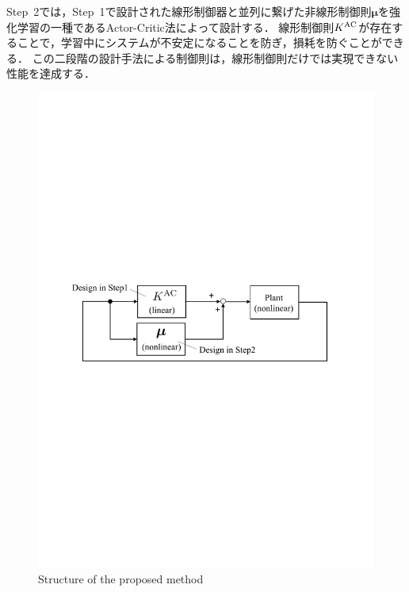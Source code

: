 \documentclass[twocolumn]{jarticle}
\begin{document}
Step~2では，Step~1で設計された線形制御器と並列に繋げた非線形制御則$\bm{\mu}$を強化学習の一種であるActor-Critic法\cite{Sutton_RL}によって設計する．
線形制御則$K^{\rm{AC}}$が存在することで，学習中にシステムが不安定になることを防ぎ，損耗を防ぐことができる．
この二段階の設計手法による制御則は，線形制御則だけでは実現できない性能を達成する．

\begin{figure}[tb]
    \centering
    \includegraphics[width=\columnwidth] {figures/model_free_two_step_controller_design_characterless.pdf}
    \caption{Structure of the proposed method}
    \label{fig:proposed_method}
\end{figure}
\end{document}
